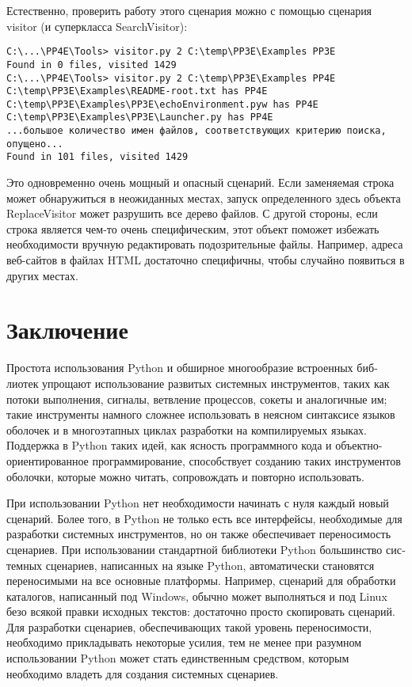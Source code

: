 \documentclass[12pt]{article}
\begin{document}
Естественно, проверить работу этого сценария можно с помощью сценария visitor (и суперкласса SearchVisitor):
\begin{verbatim}
C:\...\PP4E\Tools> visitor.py 2 C:\temp\PP3E\Examples PP3E
Found in 0 files, visited 1429
C:\...\PP4E\Tools> visitor.py 2 C:\temp\PP3E\Examples PP4E
C:\temp\PP3E\Examples\README-root.txt has PP4E
C:\temp\PP3E\Examples\PP3E\echoEnvironment.pyw has PP4E
C:\temp\PP3E\Examples\PP3E\Launcher.py has PP4E
...большое количество имен файлов, соответствующих критерию поиска,
опущено...
Found in 101 files, visited 1429
\end{verbatim}
Это одновременно очень мощный и опасный сценарий. Если заменяемая
строка может обнаружиться в неожиданных местах, запуск определенного здесь объекта ReplaceVisitor может разрушить все дерево файлов.
С другой стороны, если строка является чем-то очень специфическим,
этот объект поможет избежать необходимости вручную редактировать
подозрительные файлы. Например, адреса веб-сайтов в файлах HTML
достаточно специфичны, чтобы случайно появиться в других местах.
\section{Заключение}
Простота использования Python и обширное многообразие встроенных биб­лиотек упрощают использование развитых сис­темных инструментов, таких как потоки выполнения, сигналы, ветвление процессов, сокеты и аналогичные им; такие инструменты намного сложнее использовать в неясном синтаксисе языков оболочек и в многоэтапных циклах разработки на компилируемых языках. Поддержка в Python таких идей, как ясность программного кода и объектно-ориентированное программирование, способствует созданию таких инструментов оболочки, которые можно читать, сопровождать и повторно использовать. 

При использовании Python нет необходимости начинать с нуля каждый новый сценарий.
Более того, в Python не только есть все интерфейсы, необходимые для разработки сис­темных инструментов, но он также обеспечивает переносимость сценариев. При использовании стандартной биб­лиотеки Python большинство сис­темных сценариев, написанных на языке Python, автоматически становятся переносимыми на все основные платформы. Например, сценарий для обработки каталогов, написанный под Windows, обычно может выполняться и под Linux безо всякой правки исходных текстов: достаточно просто скопировать сценарий. Для разработки сценариев, обеспечивающих такой уровень переносимости, необходимо прикладывать некоторые усилия, тем не
менее при разумном использовании Python может стать единственным средством, которым необходимо владеть для создания сис­темных сценариев.
\end{document}
